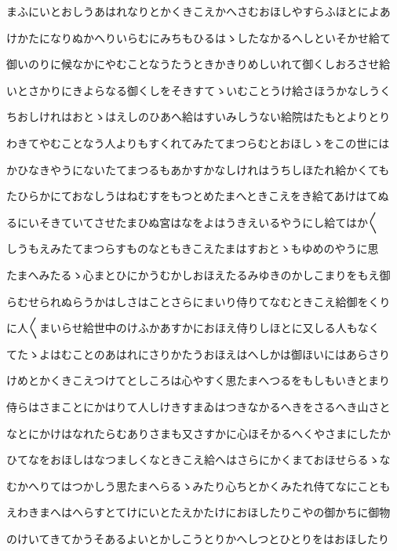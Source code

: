 \documentclass[a4paper,11pt,landscape]{ltjtarticle}
\begin{document}
\par\medskip
まふにいとおしうあはれなりとかくきこえかへさむおほしやすらふほとによあ
\par\medskip
けかたになりぬかへりいらむにみちもひるはゝしたなかるへしといそかせ給て
\par\medskip
御いのりに候なかにやむことなうたうときかきりめしいれて御くしおろさせ給
\par\medskip
いとさかりにきよらなる御くしをそきすてゝいむことうけ給さほうかなしうく
\par\medskip
ちおしけれはおとゝはえしのひあへ給はすいみしうない給院はたもとよりとり
\par\medskip
わきてやむことなう人よりもすくれてみたてまつらむとおほしゝをこの世には
\par\medskip
かひなきやうにないたてまつるもあかすかなしけれはうちしほたれ給かくても
\par\medskip
たひらかにておなしうはねむすをもつとめたまへときこえをき給てあけはてぬ
\par\medskip
るにいそきていてさせたまひぬ宮はなをよはうきえいるやうにし給てはか〱
\par\medskip
しうもえみたてまつらすものなともきこえたまはすおとゝもゆめのやうに思
\par\medskip
たまへみたるゝ心まとひにかうむかしおほえたるみゆきのかしこまりをもえ御
\par\medskip
らむせられぬらうかはしさはことさらにまいり侍りてなむときこえ給御をくり
\par\medskip
に人〱まいらせ給世中のけふかあすかにおほえ侍りしほとに又しる人もなく
\par\medskip
てたゝよはむことのあはれにさりかたうおほえはへしかは御ほいにはあらさり
\par\medskip
けめとかくきこえつけてとしころは心やすく思たまへつるをもしもいきとまり
\par\medskip
侍らはさまことにかはりて人しけきすまゐはつきなかるへきをさるへき山さと
\par\medskip
なとにかけはなれたらむありさまも又さすかに心ほそかるへくやさまにしたか
\par\medskip
ひてなをおほしはなつましくなときこえ給へはさらにかくまておほせらるゝな
\par\medskip
むかへりてはつかしう思たまへらるゝみたり心ちとかくみたれ侍てなにことも
\par\medskip
えわきまへはへらすとてけにいとたえかたけにおほしたりこやの御かちに御物
\par\medskip
のけいてきてかうそあるよいとかしこうとりかへしつとひとりをはおほしたり
\par\medskip
\end{document}
